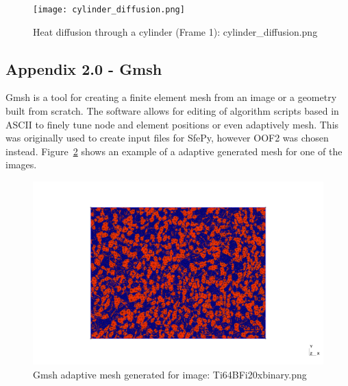 \documentclass[\report.tex]{subfiles}
\begin{document}
\begin{figure}[h!]
    \centering
    \texttt{[image: cylinder\_diffusion.png]}
    \caption{Heat diffusion through a cylinder (Frame 1): cylinder\_diffusion.png}
    \label{fig:sfepy_example}
\end{figure}


\subsection{Appendix 2.0 - Gmsh}
Gmsh is a tool for creating a finite element mesh from an image or a geometry built from scratch. The software allows for editing of algorithm scripts based in ASCII to finely tune node and element positions or even adaptively mesh. This was originally used to create input files for SfePy, however OOF2 was chosen instead. Figure~\ref{fig:gmsh} shows an example of a adaptive generated mesh for one of the images.

\begin{figure}[h!]
    \centering
    \includegraphics[width=14cm]{Images/out.png}
    \caption{Gmsh adaptive mesh generated for image: Ti64BFi20xbinary.png}
    \label{fig:gmsh}
\end{figure}
\end{document}
